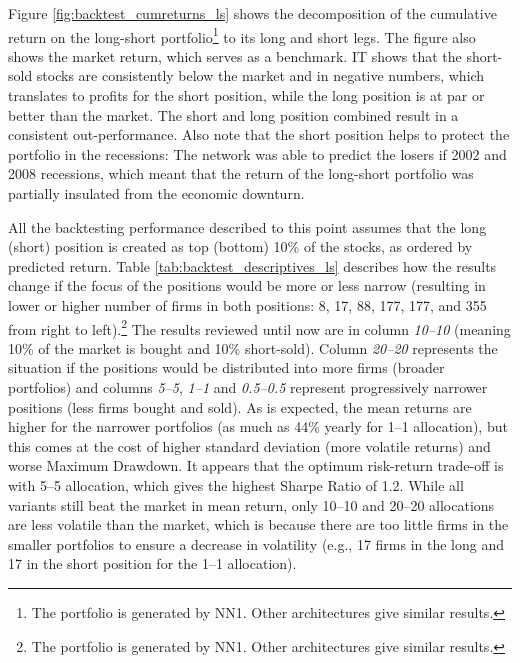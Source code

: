 		Figure \ref{fig:backtest_cumreturns_ls} shows the decomposition of the cumulative return on the long-short portfolio\footnote{The portfolio is generated by NN1. Other architectures give similar results.} to its long and short legs. The figure also shows the market return, which serves as a benchmark. IT shows that the short-sold stocks are consistently below the market and in negative numbers, which translates to profits for the short position, while the long position is at par or better than the market. The short and long position combined result in a consistent out-performance. Also note that the short position helps to protect the portfolio in the recessions: The network was able to predict the losers if 2002 and 2008 recessions, which meant that the return of the long-short portfolio was partially insulated from the economic downturn.     
		
		
		All the backtesting performance described to this point assumes that the long (short) position is created as top (bottom) 10\%  of the stocks, as ordered by predicted return. Table \ref{tab:backtest_descriptives_ls} describes how the results change if the focus of the positions would be more or less narrow (resulting in lower or higher number of firms in both positions: 8, 17, 88, 177, 177, and 355 from right to left).\footnote{The portfolio is generated by NN1. Other architectures give similar results.} The results reviewed until now are in column \textit{10--10} (meaning 10\% of the market is bought and 10\% short-sold). Column \textit{20--20} represents the situation if the positions would be distributed into more firms (broader portfolios) and columns \textit{5--5}, \textit{1--1} and \textit{0.5--0.5} represent progressively narrower positions (less firms bought and sold). As is expected, the mean returns are higher for the narrower portfolios (as much as 44\% yearly for 1--1 allocation), but this comes at the cost of higher standard deviation (more volatile returns) and worse Maximum Drawdown. It appears that the optimum risk-return trade-off is with 5--5 allocation, which gives the highest Sharpe Ratio of 1.2. While all variants still beat the market in mean return, only 10--10 and 20--20 allocations are less volatile than the market, which is because there are too little firms in the smaller portfolios  to ensure a decrease in volatility (e.g., 17 firms in the long and 17 in the short position for the 1--1 allocation).
		
